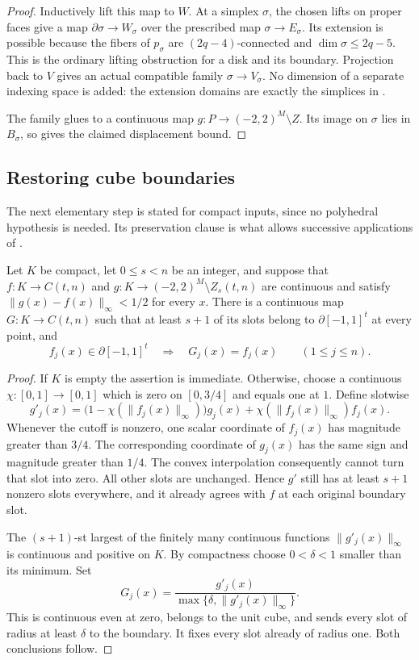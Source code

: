 \begin{proof}
Inductively lift this map to $W$.  At a simplex $\sigma$, the chosen
lifts on proper faces give a map $\partial\sigma\to W_\sigma$ over
the prescribed map $\sigma\to E_\sigma$.  Its extension is possible
because the fibers of $p_\sigma$ are $(2q-4)$-connected and
$\dim\sigma\le2q-5$.  This is the ordinary lifting obstruction for
a disk and its boundary.  Projection back to $V$ gives an actual
compatible family $\sigma\to V_\sigma$.  No dimension of a separate
indexing space is added: the extension domains are exactly the
simplices in .

The family glues to a continuous map $g:P\to(-2,2)^M\setminus Z$.
Its image on $\sigma$ lies in $B_\sigma$, so
 gives the claimed displacement bound.
\end{proof}

\subsection{Restoring cube boundaries}

The next elementary step is stated for compact inputs, since no
polyhedral hypothesis is needed.  Its preservation clause is what
allows successive applications of .

\begin{lemma}\label{lem:boundary-restoration}
Let $K$ be compact, let $0\le s<n$ be an integer, and suppose that
$f:K\to C(t,n)$ and
$g:K\to(-2,2)^M\setminus Z_s(t,n)$ are continuous and satisfy
$\|g(x)-f(x)\|_\infty<1/2$ for every $x$.
There is a continuous map $G:K\to C(t,n)$ such that at least $s+1$
of its slots belong to $\partial[-1,1]^t$ at every point, and
\[
 f_j(x)\in\partial[-1,1]^t\quad\Longrightarrow\quad G_j(x)=f_j(x)
 \qquad(1\le j\le n).
\]
\end{lemma}

\begin{proof}
If $K$ is empty the assertion is immediate.  Otherwise,
choose a continuous $\chi:[0,1]\to[0,1]$ which is zero on $[0,3/4]$
and equals one at $1$.  Define slotwise
\[
 g'_j(x)=\bigl(1-\chi(\|f_j(x)\|_\infty)\bigr)g_j(x)
       +\chi(\|f_j(x)\|_\infty)f_j(x).
\]
Whenever the cutoff is nonzero, one scalar coordinate of $f_j(x)$ has
magnitude greater than $3/4$.  The corresponding coordinate of
$g_j(x)$ has the same sign and magnitude greater than $1/4$.
The convex interpolation consequently cannot turn that slot into zero.
All other slots are unchanged.  Hence $g'$ still has at least $s+1$
nonzero slots everywhere, and it already agrees with $f$ at each
original boundary slot.

The $(s+1)$-st largest of the finitely many continuous functions
$\|g'_j(x)\|_\infty$ is continuous and positive on $K$.
By compactness choose $0<\delta<1$ smaller than its minimum.  Set
\[
 G_j(x)=\frac{g'_j(x)}{\max\{\delta,\|g'_j(x)\|_\infty\}}.
\]
This is continuous even at zero, belongs to the unit cube, and sends
every slot of radius at least $\delta$ to the boundary.  It fixes
every slot already of radius one.  Both conclusions follow.
\end{proof}
